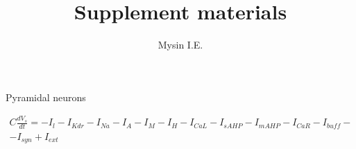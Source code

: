 \documentclass[12pt]{article}
\title{Supplement materials}
\date{}
\author{Mysin I.E.}
\begin{document}
	\maketitle
	Pyramidal neurons
	
	\newline

	\begin{multline}
C\frac{dV_s}{dt} = -I_l - I_{Kdr}-I_{Na} -I_A - I_M-I_H-I_{CaL} - I_{sAHP}-I_{mAHP} -I_{CaR}-I_{buff}-\\
-I_{syn}+I_{ext}
	\end{multline}
\end{document}

